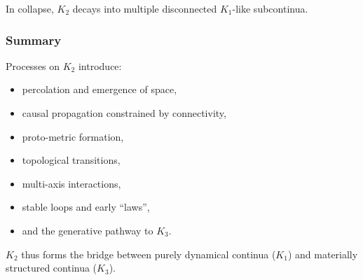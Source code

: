 In collapse, $K_2$ decays into multiple disconnected $K_1$-like
subcontinua.

\subsubsection{Summary}

Processes on $K_2$ introduce:

\begin{itemize}
    \item percolation and emergence of space,
    \item causal propagation constrained by connectivity,
    \item proto-metric formation,
    \item topological transitions,
    \item multi-axis interactions,
    \item stable loops and early “laws”,
    \item and the generative pathway to $K_3$.
\end{itemize}

$K_2$ thus forms the bridge between purely dynamical continua ($K_1$)
and materially structured continua ($K_3$).
